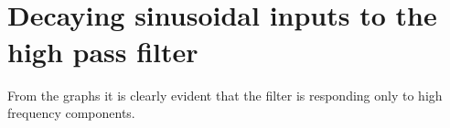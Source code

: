 \documentclass[11pt]{article}
\begin{document}
    \begin{center}
    \end{center}
    { \hspace*{\fill} \\}
    
    \begin{center}
    \end{center}
    { \hspace*{\fill} \\}
    
    \hypertarget{decaying-sinusoidal-inputs-to-the-high-pass-filter}{%
\section{Decaying sinusoidal inputs to the high pass
filter}\label{decaying-sinusoidal-inputs-to-the-high-pass-filter}}

From the graphs it is clearly evident that the filter is responding only
to high frequency components.
\end{document}
